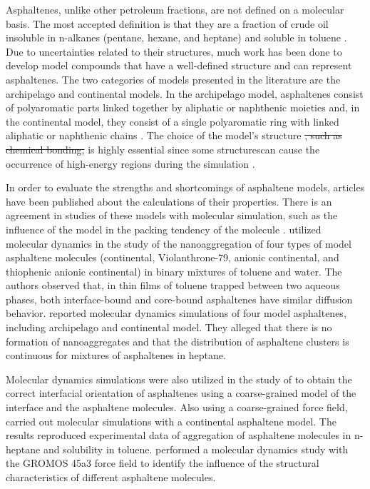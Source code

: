 \documentclass[
	12pt,				%
	openany,			%
	oneside,			%
	a4paper,			%
	english,			%
	brazil				%
	]{abntex2}
\providecommand{\DIFadd}[1]{{\protect\color{blue}\uwave{#1}}}
\providecommand{\DIFdel}[1]{{\protect\color{red}\sout{#1}}}
\providecommand{\DIFaddbegin}{}
\providecommand{\DIFaddend}{}
\providecommand{\DIFdelbegin}{}
\providecommand{\DIFdelend}{}
\providecommand{\DIFadd}[1]{{\protect\color{blue}\uwave{#1}}} %
\providecommand{\DIFdel}[1]{{\protect\color{red}\sout{#1}}}                      %
\providecommand{\DIFaddbegin}{} %
\providecommand{\DIFaddend}{} %
\providecommand{\DIFdelbegin}{} %
\providecommand{\DIFdelend}{} %
\begin{document}
Asphaltenes, unlike other petroleum fractions, are not defined on a molecular basis. The most accepted definition is that they are a fraction of crude oil insoluble in n-alkanes (pentane, hexane, and heptane) and soluble in toluene \cite{SJOBLOM2003399}. Due to uncertainties related to their structures, much work has been done to develop model compounds that have a well-defined structure and can represent asphaltenes. The two categories of models presented in the literature are the archipelago and continental models. In the archipelago model, asphaltenes consist of polyaromatic parts linked together by aliphatic or naphthenic moieties and, in the continental model, they consist of a single
polyaromatic ring with linked aliphatic or naphthenic chains \cite{doi:10.1021/ef900975e,doi:10.1080/0892702031000148762}. The choice of the model's structure \DIFdelbegin \DIFdel{, such as chemical bonding, }\DIFdelend is highly essential since some structures\DIFaddbegin \DIFadd{/ arrangements }\DIFaddend can cause the occurrence of high-energy regions during the simulation \cite{doi:10.1021/ef200507c} .   

In order to evaluate the strengths and shortcomings of asphaltene models, articles have been published about the calculations of their properties. There is an agreement in studies of these models with molecular simulation, such as the influence of the model in the packing tendency of the molecule \cite{doi:10.1080/10298436.2011.575141}.  utilized molecular dynamics in the study of the nanoaggregation of four types of model asphaltene molecules (continental, Violanthrone-79, anionic continental, and thiophenic anionic continental) in binary mixtures of toluene and water. The authors observed that, in thin films of toluene trapped between two aqueous phases, both interface-bound and core-bound asphaltenes have similar diffusion behavior.  reported molecular dynamics simulations of four model asphaltenes, including archipelago and continental model. They alleged that there is no formation of nanoaggregates and that the distribution of asphaltene clusters is continuous for mixtures of asphaltenes in heptane. 

Molecular dynamics simulations were also utilized in the study of   to obtain the correct interfacial orientation of asphaltenes using a coarse-grained model of the interface and the asphaltene molecules. Also using a coarse-grained force field,  carried out molecular simulations with a continental asphaltene model. The results reproduced experimental data of aggregation
of asphaltene molecules in n-heptane and solubility in toluene.  performed a molecular
dynamics study with the GROMOS 45a3 force field \cite{JCC:JCC1078} to identify the influence of the structural characteristics of different asphaltene molecules.
\end{document}
